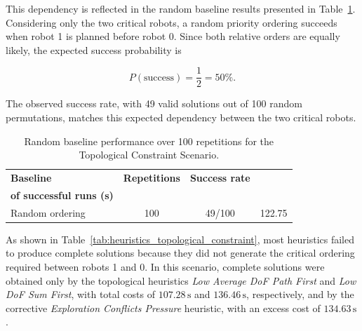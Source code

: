 This dependency is reflected in the random baseline results presented in
Table~\ref{tab:random_baseline_topological_constraint}. Considering only the two critical robots,
a random priority ordering succeeds when robot 1 is planned before robot 0. Since both relative
orders are equally likely, the expected success probability is

\begin{equation}
    P(\text{success})
    =
    \frac{1}{2}
    =
    50\%.
\end{equation}

The observed success rate, with 49 valid solutions out of 100 random permutations, matches this
expected dependency between the two critical robots.

\begin{table}[H]
\centering
\caption{Random baseline performance over 100 repetitions for the Topological Constraint Scenario.}
\label{tab:random_baseline_topological_constraint}
\footnotesize
\setlength{\tabcolsep}{6pt}
\begin{tabular}{@{}lccc@{}}
\toprule
\textbf{Baseline} & \textbf{Repetitions} & \textbf{Success rate} & \makecell{\textbf{Mean excess cost}\\\textbf{of successful runs (s)}} \\
\midrule
Random ordering & 100 & 49/100 & 122.75 \\
\bottomrule
\end{tabular}
\end{table}

As shown in Table~\ref{tab:heuristics_topological_constraint}, most heuristics failed to produce
complete solutions because they did not generate the critical ordering required between robots 1
and 0. In this scenario, complete solutions were obtained only by the topological
heuristics \textit{Low Average DoF Path First} and \textit{Low DoF Sum First}, with total
costs of \(107.28\,\mathrm{s}\) and \(136.46\,\mathrm{s}\), respectively, and by the corrective
\textit{Exploration Conflicts Pressure} heuristic, with an excess cost of \(134.63\,\mathrm{s}\).

